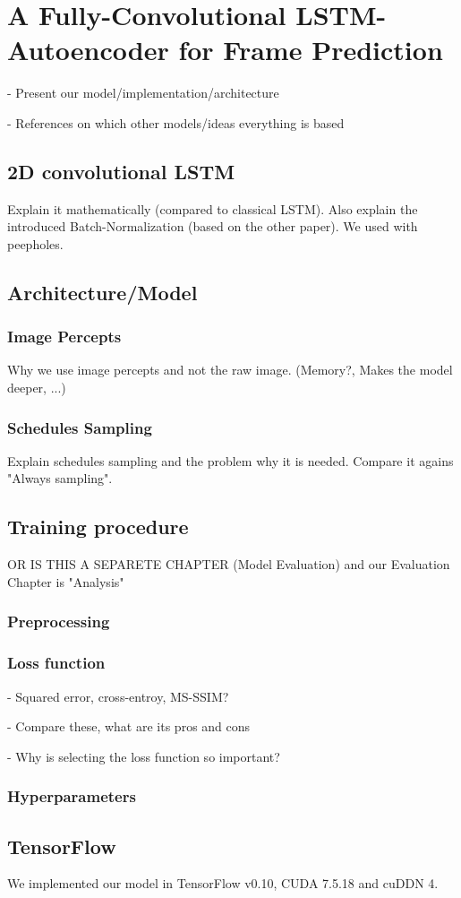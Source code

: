
\chapter{A Fully-Convolutional LSTM-Autoencoder for Frame Prediction}

- Present our model/implementation/architecture

- References on which other models/ideas everything is based

\section{2D convolutional LSTM}

Explain it mathematically (compared to classical LSTM).
Also explain the introduced Batch-Normalization (based on the other paper).
We used with peepholes.


\section{Architecture/Model}


\subsection{Image Percepts}

Why we use image percepts and not the raw image.
(Memory?, Makes the model deeper, ...)

\subsection{Schedules Sampling}

Explain schedules sampling and the problem why it is needed. Compare it agains "Always sampling".


\section{Training procedure}

OR IS THIS A SEPARETE CHAPTER (Model Evaluation) and our Evaluation Chapter is "Analysis"

\subsection{Preprocessing}

\subsection{Loss function}

- Squared error, cross-entroy, MS-SSIM?

- Compare these, what are its pros and cons

- Why is  selecting the loss function so important?

\subsection{Hyperparameters}

\section{TensorFlow}

We implemented our model in TensorFlow v0.10, CUDA 7.5.18 and cuDDN 4.




